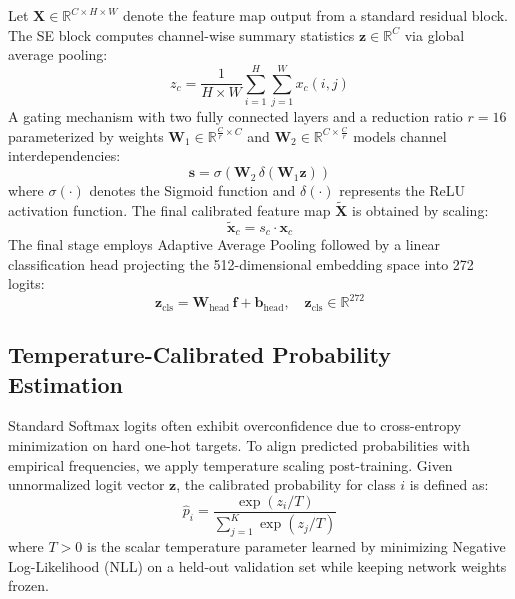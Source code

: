 \documentclass[conference]{IEEEtran}
\begin{document}
Let $\mathbf{X} \in \mathbb{R}^{C \times H \times W}$ denote the feature map output from a standard residual block. The SE block computes channel-wise summary statistics $\mathbf{z} \in \mathbb{R}^C$ via global average pooling:
\begin{equation}
z_c = \frac{1}{H \times W} \sum_{i=1}^{H} \sum_{j=1}^{W} x_c(i, j)
\end{equation}
A gating mechanism with two fully connected layers and a reduction ratio $r = 16$ parameterized by weights $\mathbf{W}_1 \in \mathbb{R}^{\frac{C}{r} \times C}$ and $\mathbf{W}_2 \in \mathbb{R}^{C \times \frac{C}{r}}$ models channel interdependencies:
\begin{equation}
\mathbf{s} = \sigma\left(\mathbf{W}_2 \, \delta\left(\mathbf{W}_1 \mathbf{z}\right)\right)
\end{equation}
where $\sigma(\cdot)$ denotes the Sigmoid function and $\delta(\cdot)$ represents the ReLU activation function. The final calibrated feature map $\widetilde{\mathbf{X}}$ is obtained by scaling:
\begin{equation}
\widetilde{\mathbf{x}}_c = s_c \cdot \mathbf{x}_c
\end{equation}
The final stage employs Adaptive Average Pooling followed by a linear classification head projecting the 512-dimensional embedding space into 272 logits:
\begin{equation}
\mathbf{z}_{\text{cls}} = \mathbf{W}_{\text{head}} \, \mathbf{f} + \mathbf{b}_{\text{head}}, \quad \mathbf{z}_{\text{cls}} \in \mathbb{R}^{272}
\end{equation}

\subsection{Temperature-Calibrated Probability Estimation}
Standard Softmax logits often exhibit overconfidence due to cross-entropy minimization on hard one-hot targets. To align predicted probabilities with empirical frequencies, we apply temperature scaling post-training. Given unnormalized logit vector $\mathbf{z}$, the calibrated probability for class $i$ is defined as:
\begin{equation}
\hat{p}_i = \frac{\exp\left(z_i / T\right)}{\sum_{j=1}^{K} \exp\left(z_j / T\right)}
\end{equation}
where $T > 0$ is the scalar temperature parameter learned by minimizing Negative Log-Likelihood (NLL) on a held-out validation set while keeping network weights frozen. 
\end{document}
